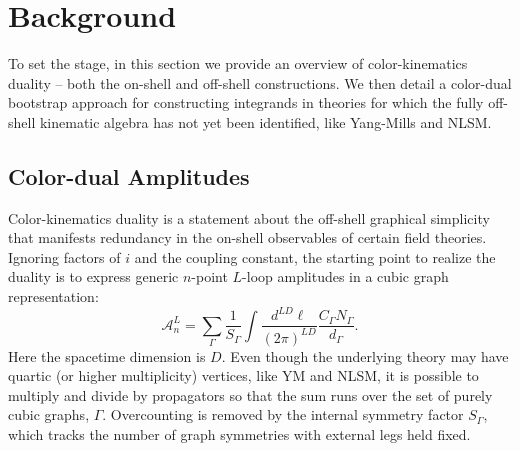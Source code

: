 \documentclass[11pt,letter]{article}
\begin{document}
\section{Background}\label{background}
To set the stage, in this section we provide an overview of
color-kinematics duality -- both the on-shell and off-shell
constructions. We then detail a color-dual bootstrap approach for
constructing integrands in theories for which the fully off-shell kinematic
algebra has not yet been identified, like Yang-Mills and NLSM.
\subsection{Color-dual Amplitudes}\label{onShellCK}

Color-kinematics duality is a statement about the off-shell graphical
simplicity that manifests redundancy in the on-shell observables of
certain field theories. Ignoring factors of $i$ and the coupling
constant, the starting point to realize the duality is to express generic $n$-point $L$-loop amplitudes in a cubic graph representation:
\begin{equation}
  \mathcal{A}_n^L = \sum \limits_\Gamma \frac{1}{S_\Gamma} \int \frac{d^{LD}\ell}{(2\pi)^{LD}} \frac{C_\Gamma N_\Gamma}{d_\Gamma} .
  \label{eq:gen-amp}
\end{equation}
Here the spacetime dimension is $D$.  Even though the underlying
theory may have quartic (or higher multiplicity) vertices, like YM and NLSM, it is
possible to multiply and divide by propagators so that the sum runs
over the set of purely cubic graphs, $\Gamma$.  Overcounting is removed by
the internal symmetry factor $S_\Gamma$, which tracks the number of
graph symmetries with external legs held fixed.  
\end{document}

